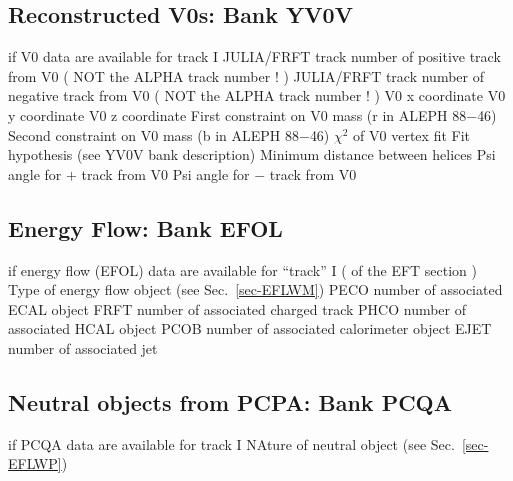 \subsection{\label{sec-TVAYV0V}Reconstructed V0s: Bank YV0V}
\par
\begin{indentlist}{ 3.00cm}{ 3.25cm}
 if V0 data are available for track I
JULIA/FRFT track number of positive track from V0 ( NOT the ALPHA track number ! )
JULIA/FRFT track number of negative track from V0 ( NOT the ALPHA track number ! )
V0 x coordinate
V0 y coordinate
V0 z coordinate
First constraint on V0 mass (r in ALEPH 88$-$46)
Second constraint on V0 mass (b in ALEPH 88$-$46)
$\chi^2$ of V0 vertex fit
Fit hypothesis (see YV0V bank description)
Minimum distance between helices
Psi angle for $+$ track from V0
Psi angle for $-$ track from V0
\end{indentlist}
 
 
\subsection{\label{sec-TVAEFOL}Energy Flow: Bank EFOL}
\par
\begin{indentlist}{ 3.00cm}{ 3.25cm}
 if energy flow (EFOL)
data are available for ``track'' I ( of the EFT section )
Type of energy flow object (see Sec.~\ref{sec-EFLWM})
PECO number of associated ECAL object
FRFT number of associated charged track
PHCO number of associated HCAL object
PCOB number of associated calorimeter object
EJET number of associated jet
\end{indentlist}
\subsection{\label{sec-TVAPCQA}Neutral objects from PCPA: Bank PCQA}
\par
\begin{indentlist}{ 3.00cm}{ 3.25cm}
 if PCQA data are available for track I
NAture of neutral object (see Sec.~\ref{sec-EFLWP})
\end{indentlist}
 
